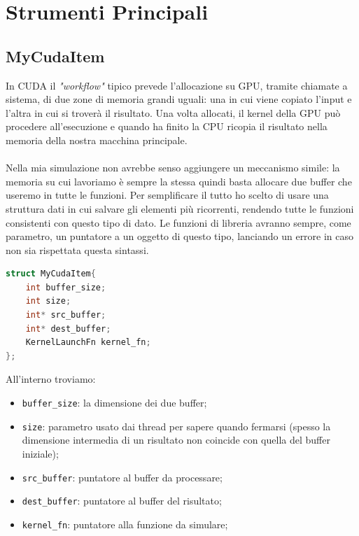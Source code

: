 \documentclass[binding=0.6cm, noexaminfo]{sapthesis}\usepackage{microtype}
\begin{document}
\section{Strumenti Principali}
\subsection{MyCudaItem}
In CUDA il \textit{"workflow"} tipico prevede l'allocazione su GPU, tramite chiamate a sistema, di due zone di memoria grandi uguali: una in cui viene copiato l'input e l'altra in cui si troverà il risultato. Una volta allocati, il kernel della GPU può procedere all'esecuzione e quando ha finito la CPU ricopia il risultato nella memoria della nostra macchina principale.
\\\\
 Nella mia simulazione non avrebbe senso aggiungere un meccanismo simile: la memoria su cui lavoriamo è sempre la stessa quindi basta allocare due buffer che useremo in tutte le funzioni. Per semplificare il tutto ho scelto di usare una struttura dati in cui salvare gli elementi più ricorrenti, rendendo tutte le funzioni consistenti con questo tipo di dato. Le funzioni di 
libreria avranno sempre, come parametro, un puntatore a un oggetto di questo tipo, lanciando un errore
in caso non sia rispettata questa sintassi. 
\begin{lstlisting}[language=C]
struct MyCudaItem{
    int buffer_size;
    int size;
    int* src_buffer;
    int* dest_buffer;
    KernelLaunchFn kernel_fn;
};
\end{lstlisting}
All'interno troviamo:
\begin{itemize}
    \item \texttt{buffer\_size}: la dimensione dei due buffer;
    \item \texttt{size}: parametro usato dai thread per sapere quando fermarsi (spesso la dimensione intermedia di un risultato non coincide con quella del buffer iniziale);
    \item \texttt{src\_buffer}: puntatore al buffer da processare;
    \item \texttt{dest\_buffer}: puntatore al buffer del risultato;
    \item \texttt{kernel\_fn}: puntatore alla funzione da simulare;
\end{itemize} 
\end{document}
